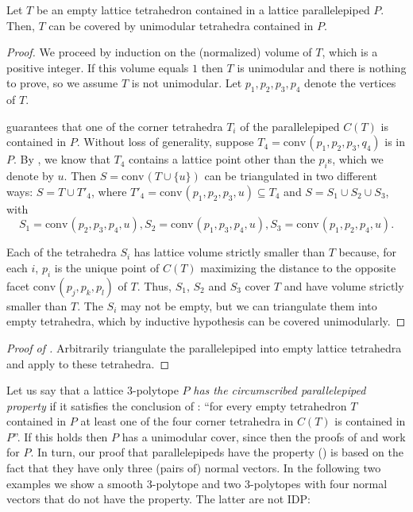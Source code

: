 \documentclass[12pt]{article}
\newcommand{\conv}{\ensuremath{\mathrm{conv}}\hspace{1pt}}
\begin{document}
\begin{corollary}
\label{coro:coverpara}
Let $T$ be an empty lattice tetrahedron contained in a lattice parallelepiped $P$. Then, $T$ can be covered by unimodular tetrahedra contained in $P$.
\end{corollary}
\begin{proof}
We proceed by induction on the (normalized) volume of $T$, which is a positive integer. If this volume equals $1$ then $T$ is unimodular and there is nothing to prove, so we assume $T$ is not unimodular. Let $p_1, p_2, p_3, p_4$ denote the vertices of $T$.

 guarantees that one of the corner tetrahedra $T_i$ of the parallelepiped $C(T)$ is contained in $P$. Without loss of generality, suppose $T_4 = \conv(p_1, p_2, p_3,q_4)$ is in $P$. By , we know that $T_4$ contains a lattice point other than the $p_i$s, which we denote by $u$. 
%
Then $S=\conv(T\cup \{u\})$ can be triangulated in two different ways: $S=T \cup T'_4$, where $T'_4 = \conv(p_1, p_2, p_3, u) \subseteq T_4$ and $S= S_1 \cup S_2 \cup S_3$, with
\[
S_1= \conv(p_2,p_3,p_4, u),
S_2=\conv(p_1,p_3,p_4, u),
S_3=\conv(p_1,p_2,p_4, u).
\]

Each of the tetrahedra $S_i$ has lattice volume strictly smaller than $T$ because, for each $i$, $p_i$ is the unique point of $C(T)$ maximizing the distance to the opposite facet $\conv(p_j,p_k,p_l)$ of $T$. Thus, $S_1$, $S_2$ and $S_3$ cover $T$ and have volume strictly smaller than $T$. The $S_i$ may not be empty, but we can triangulate them into empty tetrahedra, which by inductive hypothesis can be covered unimodularly.
\end{proof}

\begin{proof}[Proof of ]
Arbitrarily triangulate the parallelepiped into empty lattice tetrahedra and apply  to these tetrahedra.
\end{proof}


Let us say that a lattice $3$-polytope $P$ \emph{has the circumscribed parallelepiped property} if it satisfies the conclusion of :  ``for every empty tetrahedron $T$ contained in $P$ at least one of the four corner tetrahedra in $C(T)$ is 
contained in $P$''. 
If this holds then $P$ has a unimodular cover, since then the proofs of  and  work for $P$.
In turn, our proof that parallelepipeds have the property () is based on the fact that they have only three (pairs of) normal vectors. 
In the following two examples we show a smooth $3$-polytope and two $3$-polytopes with four normal vectors that do not have the property. The latter are not IDP:
\end{document}
